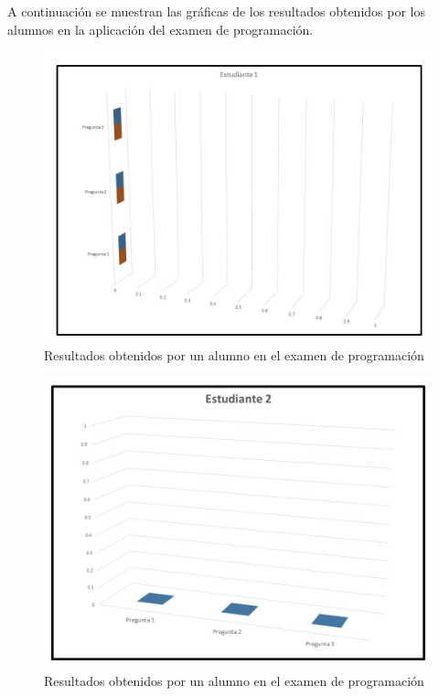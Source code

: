 \documentclass[12pt] {report}
\begin{document}
A continuación se muestran las gráficas de los resultados obtenidos por los alumnos en la aplicación del examen de programación.\\
\begin{figure}[H]
\centering 
\includegraphics[scale=.7]{PEstudiante1.JPG}
\caption{Resultados obtenidos por un alumno en el examen de programación}
\end{figure}

\begin{figure}[H]
\centering 
\includegraphics[scale=.7]{PEstudiante2.JPG}
\caption{Resultados obtenidos por un alumno en el examen de programación}
\end{figure}
\end{document}
